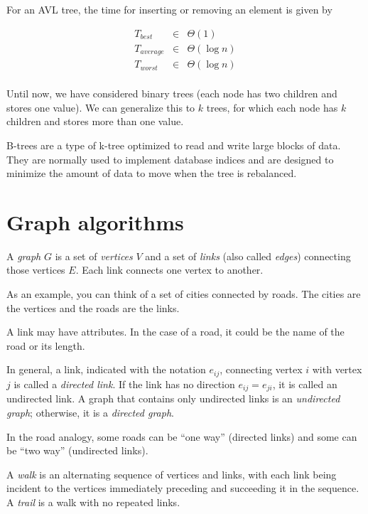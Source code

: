 \documentclass[justified, sixbynine]{tufte-book}
\theoremstyle{plain}%
\newtheorem * {corollary}{Corollary}
\theoremstyle{definition}
\theoremstyle{remark}
\newtheorem * {remark}{Remark}
\newtheorem * {note}{Note}
\begin{document}
\begin{fullwidth}
For an AVL tree, the time for inserting or removing an element is given by

\begin{eqnarray}
T_{best} &\in &\Theta (1) \\
T_{average} &\in &\Theta (\log n) \\
T_{worst} &\in &\Theta (\log n) \\
\end{eqnarray}


Until now, we have considered binary trees (each node has two children and
stores one value). We can generalize this to $k$ trees, for which each node has $k$
children and stores more than one value.

B-trees are a type of k-tree optimized to read and write large blocks of data. They are normally used to implement database indices and are designed to minimize the amount of data to move when the tree is rebalanced.

\goodbreak\section{Graph algorithms}


A {\it graph} $G$ is a set of {\it vertices} $V$ and a set of {\it links} (also called {\it edges}) connecting those vertices $E$. Each link connects one vertex to another.

As an example, you can think of a set of cities connected by roads. The cities are the vertices and the roads are the links.

A link may have attributes. In the case of a road, it could be the name of the road or its length.

In general, a link, indicated with the notation $e_{ij}$, connecting vertex $%
i $ with vertex $j$ is called a {\it directed link}. If the link has no
direction $e_{ij}=e_{ji}$, it is called an undirected link. A graph that
contains only undirected links is an {\it undirected graph}; otherwise, it is
a {\it directed graph}.

In the road analogy, some roads can be ``one way'' (directed links) and some can be ``two way'' (undirected links).

A {\it walk} is an alternating sequence of vertices and links, with each
link being incident to the vertices immediately preceding and succeeding it
in the sequence. A {\it trail} is a walk with no repeated links.


\end{fullwidth}
\end{document}
